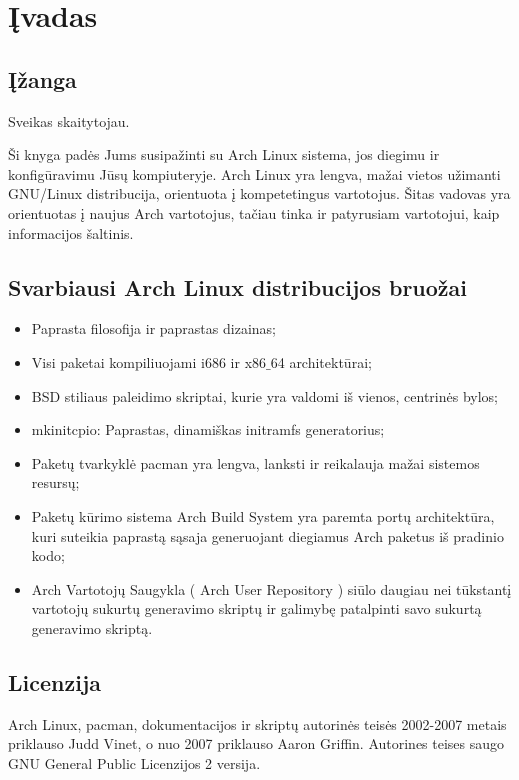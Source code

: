 \chapter{Įvadas}

  \section{Įžanga}

  Sveikas skaitytojau. 

  Ši knyga padės Jums susipažinti su Arch Linux sistema, jos
  diegimu ir konfigūravimu Jūsų kompiuteryje. Arch Linux yra lengva, mažai
  vietos užimanti GNU/Linux distribucija, orientuota į kompetetingus
  vartotojus. Šitas vadovas yra orientuotas į naujus Arch vartotojus,
  tačiau tinka ir patyrusiam vartotojui, kaip informacijos šaltinis.

  \section{Svarbiausi Arch Linux distribucijos bruožai}
  \begin{itemize}
    \item Paprasta filosofija ir paprastas dizainas;
    \item Visi paketai kompiliuojami i686 ir x86$\_$64 architektūrai;
    \item BSD stiliaus paleidimo skriptai, kurie yra valdomi iš
      vienos, centrinės bylos;
    \item mkinitcpio: Paprastas, dinamiškas initramfs generatorius;
    \item Paketų tvarkyklė pacman yra lengva, lanksti ir reikalauja mažai sistemos resursų;
    \item Paketų kūrimo sistema Arch Build System yra paremta portų
      architektūra, kuri suteikia paprastą sąsaja generuojant diegiamus Arch
      paketus iš pradinio kodo;
    \item Arch Vartotojų Saugykla ( Arch User Repository ) siūlo
      daugiau nei tūkstantį vartotojų sukurtų generavimo skriptų ir
      galimybę patalpinti savo sukurtą generavimo skriptą.
  \end{itemize}

  \section{Licenzija}

  Arch Linux, pacman, dokumentacijos ir skriptų autorinės teisės
  2002-2007 metais priklauso Judd Vinet, o nuo 2007 priklauso Aaron
  Griffin. Autorines teises saugo GNU General Public Licenzijos 2
  versija.

